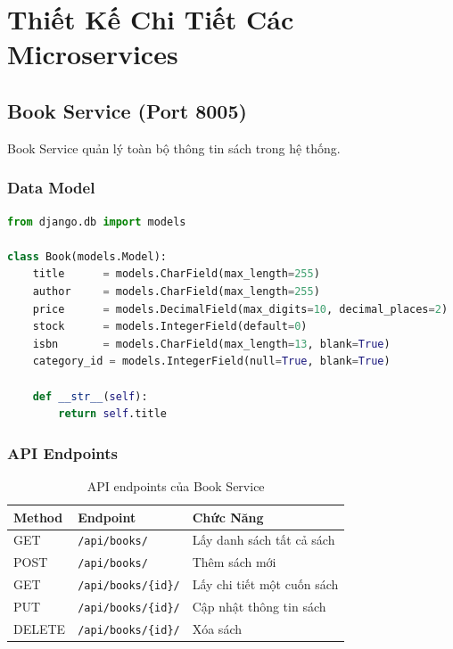 \documentclass[12pt,a4paper]{article}
\begin{document}
\section{Thiết Kế Chi Tiết Các Microservices}

\subsection{Book Service (Port 8005)}

Book Service quản lý toàn bộ thông tin sách trong hệ thống.

\subsubsection{Data Model}

\begin{lstlisting}[language=Python, caption={book-service/app/models.py}]
from django.db import models

class Book(models.Model):
    title      = models.CharField(max_length=255)
    author     = models.CharField(max_length=255)
    price      = models.DecimalField(max_digits=10, decimal_places=2)
    stock      = models.IntegerField(default=0)
    isbn       = models.CharField(max_length=13, blank=True)
    category_id = models.IntegerField(null=True, blank=True)

    def __str__(self):
        return self.title
\end{lstlisting}

\subsubsection{API Endpoints}

\begin{table}[H]
  \centering
  \caption{API endpoints của Book Service}
  \begin{tabularx}{\textwidth}{llX}
    \toprule
    \textbf{Method} & \textbf{Endpoint} & \textbf{Chức Năng} \\
    \midrule
    GET    & \texttt{/api/books/}       & Lấy danh sách tất cả sách \\
    POST   & \texttt{/api/books/}       & Thêm sách mới \\
    GET    & \texttt{/api/books/\{id\}/} & Lấy chi tiết một cuốn sách \\
    PUT    & \texttt{/api/books/\{id\}/} & Cập nhật thông tin sách \\
    DELETE & \texttt{/api/books/\{id\}/} & Xóa sách \\
    \bottomrule
  \end{tabularx}
\end{table}
\end{document}
